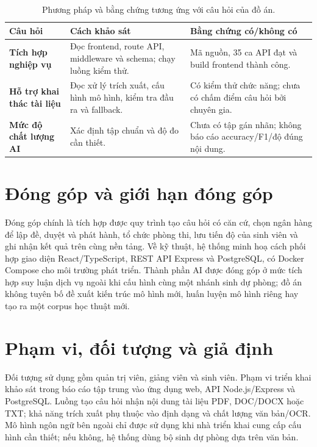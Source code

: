 \begin{table}[H]
\centering
\caption{Phương pháp và bằng chứng tương ứng với câu hỏi của đồ án.}
\label{tab:phuongphap}
\begin{tabularx}{\textwidth}{>{\bfseries\color{daunavy}}p{} X X}
\toprule
\rowcolor{gray100}Câu hỏi & Cách khảo sát & Bằng chứng có/không có \\
\midrule
Tích hợp nghiệp vụ & Đọc frontend, route API, middleware và schema; chạy luồng kiểm thử. & Mã nguồn, 35 ca API đạt và build frontend thành công. \\
Hỗ trợ khai thác tài liệu & Đọc xử lý trích xuất, cấu hình mô hình, kiểm tra đầu ra và fallback. & Có kiểm thử chức năng; chưa có chấm điểm câu hỏi bởi chuyên gia. \\
Mức độ chất lượng AI & Xác định tập chuẩn và độ đo cần thiết. & Chưa có tập gán nhãn; không báo cáo accuracy/F1/độ đúng nội dung. \\
\bottomrule
\end{tabularx}
\end{table}

\section{Đóng góp và giới hạn đóng góp}

Đóng góp chính là tích hợp được quy trình tạo câu hỏi có căn cứ, chọn ngân
hàng để lập đề, duyệt và phát hành, tổ chức phòng thi, lưu tiến độ của
sinh viên và ghi nhận kết quả trên cùng nền tảng. Về kỹ thuật, hệ thống
minh hoạ cách phối hợp giao diện React/TypeScript, REST API Express và
PostgreSQL, có Docker Compose cho môi trường phát triển. Thành phần AI được
đóng góp ở mức tích hợp suy luận dịch vụ ngoài khi cấu hình cùng một nhánh
sinh dự phòng; đồ án không tuyên bố đề xuất kiến trúc mô hình mới, huấn
luyện mô hình riêng hay tạo ra một corpus học thuật mới.

\section{Phạm vi, đối tượng và giả định}

Đối tượng sử dụng gồm quản trị viên, giảng viên và sinh viên. Phạm vi triển
khai khảo sát trong báo cáo tập trung vào ứng dụng web, API Node.js/Express
và PostgreSQL. Luồng tạo câu hỏi nhận nội dung tài liệu PDF, DOC/DOCX hoặc
TXT; khả năng trích xuất phụ thuộc vào định dạng và chất lượng văn bản/OCR.
Mô hình ngôn ngữ bên ngoài chỉ được sử dụng khi nhà triển khai cung cấp cấu
hình cần thiết; nếu không, hệ thống dùng bộ sinh dự phòng dựa trên văn bản.

